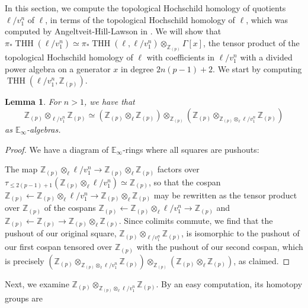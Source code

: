 \documentclass[11pt,leqno]{article}
\newcommand{\zz}{\mathbb{Z}}
\newcommand{\bb}[1]{\mathbb{#1}}
\DeclareMathOperator{\THH}{THH}
\newtheorem*{short hand}{theorem name}
\theoremstyle{plain}  %
\newtheorem{lemma}{Lemma}[section]
\theoremstyle{definition}
\numberwithin{equation}{section}
\begin{document}
\indent\indent In this section, we compute the topological Hochschild homology of quotients $\ell/v_1^n$ of $\ell$, in terms of the topological Hochschild homology of $\ell$, which was computed by Angeltveit-Hill-Lawson in \cite{angeltveit2009topological}.  We will show that $\pi_*\THH(\ell/v_1^n)\simeq \pi_*\THH(\ell,\ell/v_1^n)\otimes_{\zz_{(p)}}\Gamma[x]$, the tensor product of the topological Hochschild homology of $\ell$ with coefficients in $\ell/v_1^n$ with a divided power algebra on a generator $x$ in degree $2n(p-1)+2$.  We start by computing $\THH(\ell/v_1^n,\zz_{(p)})$.
\begin{lemma}\label{lem4.1}
	For $n>1$, we have that $$\zz_{(p)}\otimes_{\ell/v_1^n}\zz_{(p)}\simeq (\zz_{(p)}\otimes_{\ell}\zz_{(p)})\otimes_{\zz_{(p)}}(\zz_{(p)}\otimes_{\zz_{(p)}\otimes_{\ell}\ell/v_1^n}\zz_{(p)})$$ as $\bb{E}_\infty$-algebras.
\end{lemma}
\begin{proof}
We have a diagram of $\bb{E}_{\infty}$-rings where all squares are pushouts:
\begin{center}
\end{center}
The map $\zz_{(p)}\otimes_{\ell}\ell/v_1^n\to \zz_{(p)}\otimes_{\ell}\zz_{(p)}$ factors over $\tau_{\leq 2(p-1)+1}\left(\zz_{(p)}\otimes_{\ell}\ell/v_1^n\right)\simeq \zz_{(p)}$, so that the cospan $\zz_{(p)}\leftarrow \zz_{(p)}\otimes_{\ell}\ell/v_1^n\rightarrow \zz_{(p)}\otimes_{\ell}\zz_{(p)}$ may be rewritten as the tensor product over $\zz_{(p)}$ of the cospans $\zz_{(p)}\leftarrow \zz_{(p)}\otimes_{\ell}\ell/v_1^n\rightarrow \zz_{(p)}$ and $\zz_{(p)}\leftarrow \zz_{(p)}\rightarrow \zz_{(p)}\otimes_{\ell}\zz_{(p)}$.  Since colimits commute, we find that the pushout of our original square, $\zz_{(p)}\otimes_{\ell/v_1^n}\zz_{(p)}$, is isomorphic to the pushout of our first cospan tensored over $\zz_{(p)}$ with the pushout of our second cospan, which is precisely $(\zz_{(p)}\otimes_{\zz_{(p)}\otimes_{\ell}\ell/v_1^n}\zz_{(p)})\otimes_{\zz_{(p)}}(\zz_{(p)}\otimes_{\ell}\zz_{(p)})$, as claimed.
\end{proof}
Next, we examine $\zz_{(p)}\otimes_{\zz_{(p)}\otimes_{\ell}\ell/v_1^n}\zz_{(p)}$.  By an easy computation, its homotopy groups are 
\end{document}
